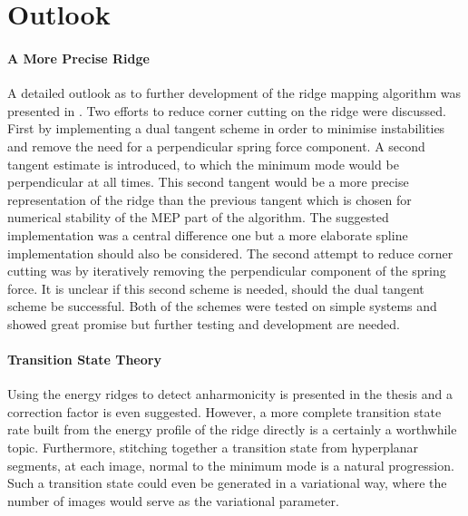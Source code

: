 \section{Outlook}
\label{sec:summary-outlook}


\paragraph{A More Precise Ridge}
A detailed outlook as to further development of the ridge mapping algorithm was presented in .
Two efforts to reduce corner cutting on the ridge were discussed.
First by implementing a dual tangent scheme in order to minimise instabilities and remove the need for a perpendicular spring force component.
A second tangent estimate is introduced, to which the minimum mode would be perpendicular at all times.
This second tangent would be a more precise representation of the ridge than the previous tangent which is chosen for numerical stability of the MEP part of the algorithm.
The suggested implementation was a central difference one but a more elaborate spline implementation should also be considered.
The second attempt to reduce corner cutting was by iteratively removing the perpendicular component of the spring force.
It is unclear if this second scheme is needed, should the dual tangent scheme be successful.
Both of the schemes were tested on simple systems and showed great promise but further testing and development are needed.

\paragraph{Transition State Theory}
Using the energy ridges to detect anharmonicity is presented in the thesis and a correction factor is even suggested.
However, a more complete transition state rate built from the energy profile of the ridge directly is a certainly a worthwhile topic.
Furthermore, stitching together a transition state from hyperplanar segments, at each image, normal to the minimum mode is a natural progression.
Such a transition state could even be generated in a variational way, where the number of images would serve as the variational parameter.

